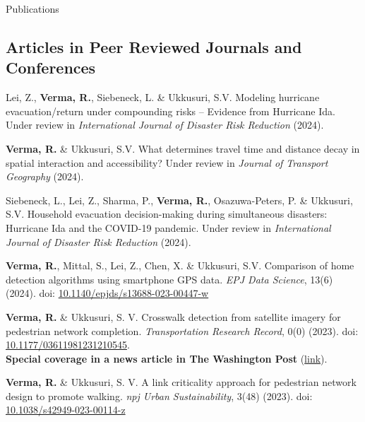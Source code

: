 \documentclass{CV} %
\begin{document}
\begin{rSection}{Publications}
    \subsection*{Articles in Peer Reviewed Journals and Conferences}
    \begin{etaremune}
        \item Lei, Z., \textbf{Verma, R.}, Siebeneck, L. \& Ukkusuri, S.V. Modeling hurricane evacuation/return under compounding risks – Evidence from Hurricane Ida. Under review in \textit{International Journal of Disaster Risk Reduction} (2024).

        \item \textbf{Verma, R.} \& Ukkusuri, S.V. What determines travel time and distance decay in spatial interaction and accessibility? Under review in \textit{Journal of Transport Geography} (2024).

        \item Siebeneck, L., Lei, Z., Sharma, P., \textbf{Verma, R.}, Osazuwa-Peters, P. \& Ukkusuri, S.V. Household evacuation decision-making during simultaneous disasters: Hurricane Ida and the COVID-19 pandemic. Under review in \textit{International Journal of Disaster Risk Reduction} (2024).

        \item \textbf{Verma, R.}, Mittal, S., Lei, Z., Chen, X. \& Ukkusuri, S.V. Comparison of home detection algorithms using smartphone GPS data.
        \textit{EPJ Data Science}, 13(6) (2024). doi: \href{https://doi.org/10.1140/epjds/s13688-023-00447-w}{10.1140/epjds/s13688-023-00447-w}
        
        \item \textbf{Verma, R.} \& Ukkusuri, S. V. Crosswalk detection from satellite imagery for pedestrian network completion. \textit{Transportation Research Record}, 0(0) (2023). doi: \href{https://doi.org/10.1177/03611981231210545}{10.1177/03611981231210545}.
        \\ \textbf{Special coverage in a news article in The Washington Post} (\href{https://www.washingtonpost.com/transportation/2023/02/25/sidewalks-crosswalks-study/}{link}).
        
        \item \textbf{Verma, R.} \& Ukkusuri, S. V. A link criticality approach for pedestrian network design to promote walking. \textit{npj Urban Sustainability}, 3(48) (2023). doi: \href{https://doi.org/10.1038/s42949-023-00114-z}{10.1038/s42949-023-00114-z}
        

\end{etaremune}
\end{rSection}
\end{document}
